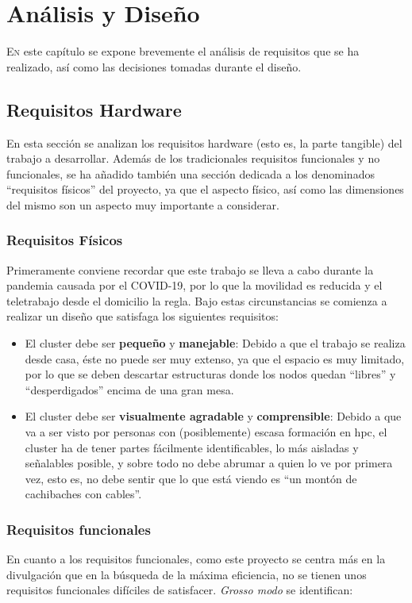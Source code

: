 \chapter{Análisis y Diseño}
\label{chap:analisis_diseño}

\lettrine{E}{n} este capítulo se expone brevemente el análisis de requisitos que se ha realizado, así como las decisiones tomadas durante el diseño.

\section{Requisitos Hardware}
\label{sec:requisitos_hardware}
En esta sección se analizan los requisitos hardware (esto es, la parte tangible) del trabajo a desarrollar. Además de los tradicionales requisitos funcionales y no funcionales, se ha añadido también una sección dedicada a los denominados ``requisitos físicos'' del proyecto, ya que el aspecto físico, así como las dimensiones del mismo son un aspecto muy importante a considerar.

\subsection{Requisitos Físicos}
Primeramente conviene recordar que este trabajo se lleva a cabo durante la pandemia causada por el COVID-19, por lo que la movilidad es reducida y el teletrabajo desde el domicilio la regla. Bajo estas circunstancias se comienza a realizar un diseño que satisfaga los siguientes requisitos:
\begin{itemize}
    \item El cluster debe ser \textbf{pequeño} y \textbf{manejable}: Debido a que el trabajo se realiza desde casa, éste no puede ser muy extenso, ya que el espacio es muy limitado, por lo que se deben descartar estructuras donde los nodos quedan ``libres'' y ``desperdigados'' encima de una gran mesa.
    \item El cluster debe ser \textbf{visualmente agradable} y \textbf{comprensible}: Debido a que va a ser visto por personas con (posiblemente) escasa formación en \acrshort{hpc}, el cluster ha de tener partes fácilmente identificables, lo más aisladas y señalables posible, y sobre todo no debe abrumar a quien lo ve por primera vez, esto es, no debe sentir que lo que está viendo es ``un montón de cachibaches con cables''.
\end{itemize}

\subsection{Requisitos funcionales}
En cuanto a los requisitos funcionales, como este proyecto se centra más en la divulgación que en la búsqueda de la máxima eficiencia, no se tienen unos requisitos funcionales difíciles de satisfacer. \textit{Grosso modo} se identifican:

